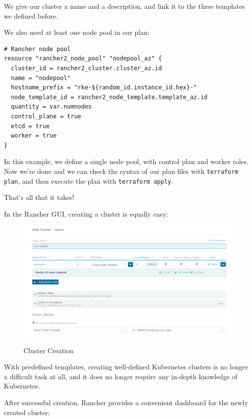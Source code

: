 We give our cluster a name and a description, and link it to the three templates we defined before. 

We also need at least one node pool in our plan:

\begin{lstlisting}[caption=Node Pool, frame=single, basicstyle=\ttfamily]
# Rancher node pool
resource "rancher2_node_pool" "nodepool_az" {
  cluster_id = rancher2_cluster.cluster_az.id
  name = "nodepool"
  hostname_prefix = "rke-${random_id.instance_id.hex}-"
  node_template_id = rancher2_node_template.template_az.id
  quantity = var.numnodes
  control_plane = true
  etcd = true
  worker = true
}
\end{lstlisting}

In this example, we define a single node pool, with control plan and worker roles. Now we're done and we can check the syntax of our plan files with \verb|terraform plan|, and then execute the plan with \verb|terraform apply|.

That's all that it takes!

In the Rancher GUI, creating a cluster is equally easy:

\begin{figure}[H]
\centering
\caption {Cluster Creation}
\includegraphics[width=\linewidth]{images/cluster-creation.png}
\label{fig:clusterCreation}
\end{figure}

With predefined templates, creating well-defined Kubernetes clusters is no longer a difficult task at all, and it does no longer require any in-depth knowledge of Kubernetes.

After successful creation, Rancher provides a convenient dashboard for the newly created cluster:

